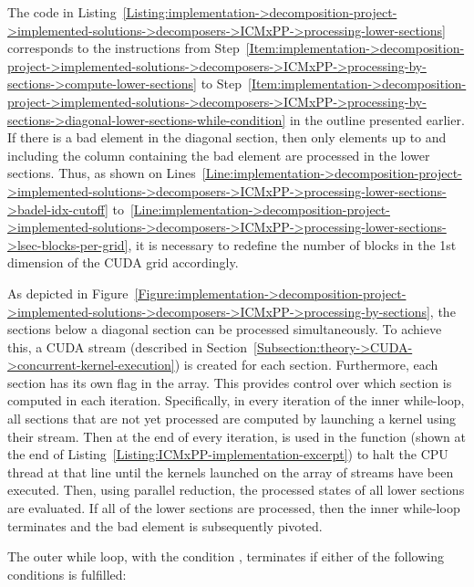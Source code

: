 The code in Listing~\ref{Listing:implementation->decomposition-project->implemented-solutions->decomposers->ICMxPP->processing-lower-sections} corresponds to the instructions from Step~\ref{Item:implementation->decomposition-project->implemented-solutions->decomposers->ICMxPP->processing-by-sections->compute-lower-sections} to Step~\ref{Item:implementation->decomposition-project->implemented-solutions->decomposers->ICMxPP->processing-by-sections->diagonal-lower-sections-while-condition} in the outline presented earlier.\\
If there is a bad element in the diagonal section, then only elements up to and including the column containing the bad element are processed in the lower sections. Thus, as shown on Lines~\ref{Line:implementation->decomposition-project->implemented-solutions->decomposers->ICMxPP->processing-lower-sections->badel-idx-cutoff} to~\ref{Line:implementation->decomposition-project->implemented-solutions->decomposers->ICMxPP->processing-lower-sections->lsec-blocks-per-grid}, it is necessary to redefine the number of blocks in the 1st dimension of the CUDA grid accordingly.

As depicted in Figure~\ref{Figure:implementation->decomposition-project->implemented-solutions->decomposers->ICMxPP->processing-by-sections}, the sections below a diagonal section can be processed simultaneously. To achieve this, a CUDA stream (described in Section~\ref{Subsection:theory->CUDA->concurrent-kernel-execution}) is created for each section. Furthermore, each section has its own  flag in the  array. This provides control over which section is computed in each iteration. Specifically, in every iteration of the inner while-loop, all sections that are not yet processed are computed by launching a kernel using their stream. Then at the end of every iteration,  is used in the  function (shown at the end of Listing~\ref{Listing:ICMxPP-implementation-excerpt}) to halt the CPU thread at that line until the kernels launched on the array of streams have been executed. Then, using parallel reduction, the processed states of all lower sections are evaluated. If all of the lower sections are processed, then the inner while-loop terminates and the bad element is subsequently pivoted.

The outer while loop, with the condition , terminates if either of the following conditions is fulfilled:

